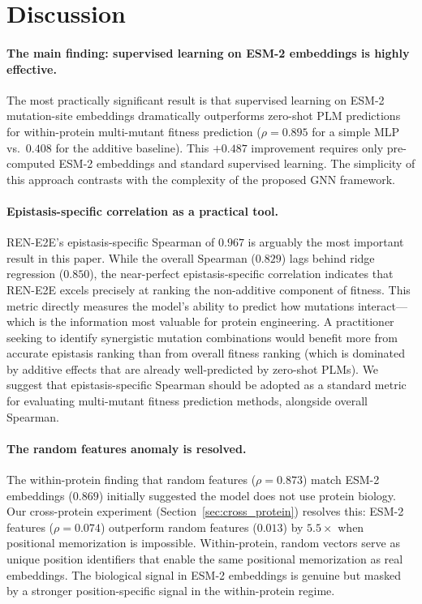 \documentclass{article}
\newcommand{\rene}{\textsc{REN-E2E}}
\begin{document}
\section{Discussion}
\label{sec:discussion}

\paragraph{The main finding: supervised learning on ESM-2 embeddings is highly effective.}
The most practically significant result is that supervised learning on ESM-2 mutation-site embeddings dramatically outperforms zero-shot PLM predictions for within-protein multi-mutant fitness prediction ($\rho = 0.895$ for a simple MLP vs.\ $0.408$ for the additive baseline). This $+0.487$ improvement requires only pre-computed ESM-2 embeddings and standard supervised learning. The simplicity of this approach contrasts with the complexity of the proposed GNN framework.

\paragraph{Epistasis-specific correlation as a practical tool.}
\rene{}'s epistasis-specific Spearman of $0.967$ is arguably the most important result in this paper. While the overall Spearman ($0.829$) lags behind ridge regression ($0.850$), the near-perfect epistasis-specific correlation indicates that \rene{} excels precisely at ranking the non-additive component of fitness. This metric directly measures the model's ability to predict how mutations interact---which is the information most valuable for protein engineering. A practitioner seeking to identify synergistic mutation combinations would benefit more from accurate epistasis ranking than from overall fitness ranking (which is dominated by additive effects that are already well-predicted by zero-shot PLMs). We suggest that epistasis-specific Spearman should be adopted as a standard metric for evaluating multi-mutant fitness prediction methods, alongside overall Spearman.

\paragraph{The random features anomaly is resolved.}
The within-protein finding that random features ($\rho = 0.873$) match ESM-2 embeddings ($0.869$) initially suggested the model does not use protein biology. Our cross-protein experiment (Section~\ref{sec:cross_protein}) resolves this: ESM-2 features ($\rho = 0.074$) outperform random features ($0.013$) by $5.5\times$ when positional memorization is impossible. Within-protein, random vectors serve as unique position identifiers that enable the same positional memorization as real embeddings. The biological signal in ESM-2 embeddings is genuine but masked by a stronger position-specific signal in the within-protein regime.
\end{document}
